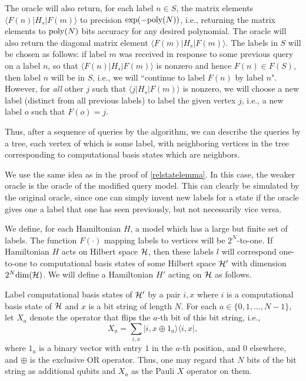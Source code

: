\documentclass[letterpaper,onecolumn]{quantumarticle}
\newcommand{\poly}{{\rm poly}}
\newcommand{\cH}{{\cal H}}
\begin{document}
The oracle will also return, for each label $n\in S$,
the matrix elements $\langle F(n) | H_s | F(m) \rangle$ to precision $\exp(-\poly(N))$, i.e., returning the matrix elements to $\poly(N)$ bits accuracy for any desired polynomial.  
The oracle will also return the diagonal matrix element $\langle F(m) | H_s | F(m) \rangle$.
The labels in $S$ will be chosen as follows: if label $m$ was received in response to some previous query on a label $n$, so that 
$\langle F(n) | H_s | F(m) \rangle$ is nonzero and hence $F(n)\in F(S)$, then label $n$ will be in $S$, i.e., we will ``continue to label $F(n)$ by label $n$".  However, for {\it all} other $j$ such that
$\langle j | H_s | F(m) \rangle$ is nonzero, we will choose a new label (distinct from all previous labels) to label the given vertex $j$, i.e., a new label $o$ such that $F(o)=j$.

Thus, after a sequence of queries by the algorithm, we can describe the queries by a tree, each vertex of which is some label, with neighboring vertices in the tree corresponding to computational basis states which are neighbors.


We use the same idea as in the proof of \cref{relstatelemma}.  In this case, the weaker oracle is the oracle of the modified query model.  This can clearly be simulated by the original oracle, since one can simply invent new labels for a state if the oracle gives one a label that one has seen previously, but not necessarily vice versa.

We define, for each Hamiltonian $H$,
 a model which has a large but finite set of labels.  The function
$F(\cdot)$ mapping labels to vertices will be $2^N$-to-one.  If Hamiltonian $H$ acts on Hilbert space $\cH$, then these labels $l$ will correspond one-to-one to computational basis states of some Hilbert space $\cH'$ with dimension $2^N {\rm dim}(\cH)$.
We will define a Hamiltonian $H'$ acting on $\cH$ as follows.


Label computational basis states of $\cH'$ by a pair $i,x$ where $i$ is a computational basis state of $\cH$ and $x$ is a bit
string of length $N$.
For each $a\in \{0,1,\ldots,N-1\}$, let $X_{a}$ denote the operator that flips the $a$-th
bit of this bit string, i.e.,
$$
X_a=\sum_{i,x} |i,x\oplus 1_a\rangle \langle i,x|,$$
where $1_a$ is a binary vector with entry $1$ in the $a$-th position, and $0$ elsewhere, and $\oplus$ is the exclusive OR operator.
Thus, one may regard that $N$ bits of the bit string as additional qubits and $X_a$ as the Pauli $X$ operator on them.
\end{document}
